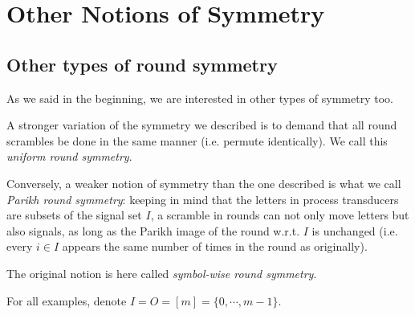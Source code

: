 \chapter{Other Notions of Symmetry}
\label{chap:other_notions}

\section{Other types of round symmetry}

As we said in the beginning, we are interested in other types of symmetry too.

A stronger variation of the symmetry we described is to demand that all round scrambles be done in the same manner (i.e. permute identically). We call this \emph{uniform round symmetry}.

Conversely, a weaker notion of symmetry than the one described is what we call \emph{Parikh round symmetry}: keeping in mind that the letters in process transducers are subsets of the signal set $I$, a scramble in rounds can not only move letters but also signals, as long as the Parikh image of the round w.r.t.\! $I$ is unchanged (i.e. every $i\in I$ appears the same number of times in the round as originally).

The original notion is here called \emph{symbol-wise round symmetry}.

For all examples, denote $I=O=[m]=\{0,\cdots, m-1\}$.

